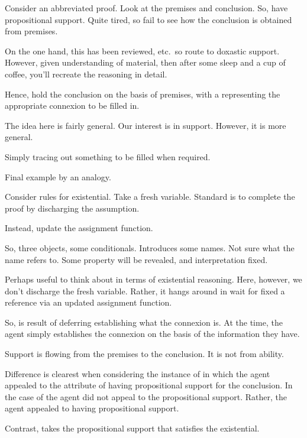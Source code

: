 \begin{note}
  Consider an abbreviated proof.
  Look at the premises and conclusion.
  So, have propositional support.
  Quite tired, so fail to see how the conclusion is obtained from premises.

  On the one hand, this has been reviewed, etc.\ so route to doxastic support.
  However, given understanding of material, then after some sleep and a cup of coffee, you'll recreate the reasoning in detail.

  Hence, hold the conclusion on the basis of premises, with a \future{} representing the appropriate connexion to be filled in.

  
\end{note}

\begin{note}
  The idea here is fairly general.
  Our interest is in support.
  However, it is more general.

  Simply tracing out something to be filled when required.
\end{note}

\begin{note}
  Final example by an analogy.

  Consider rules for existential.
  Take a fresh variable.
  Standard is to complete the proof by discharging the assumption.

  Instead, update the assignment function.

  So, three objects, some conditionals.
  Introduces some names.
  Not sure what the name refers to.
  Some property will be revealed, and interpretation fixed.
  
  Perhaps useful to think about in terms of existential reasoning.
  Here, however, we don't discharge the fresh variable.
  Rather, it hangs around in wait for fixed a reference via an updated assignment function.
\end{note}

\begin{note}[Deferring]
  So, \future{} is result of deferring establishing what the connexion is.
  At the time, the agent simply establishes the connexion on the basis of the information they have.
\end{note}

\begin{note}[Existential]
  Support is flowing from the premises to the conclusion.
  It is not from ability.

  Difference is clearest when considering the instance of \AR{} in which the agent appealed to the attribute of having propositional support for the conclusion.
  In the case of \AR{} the agent did not appeal to the propositional support.
  Rather, the agent appealed to having propositional support.

  Contrast, \WR{} takes the propositional support that satisfies the existential.
\end{note}

